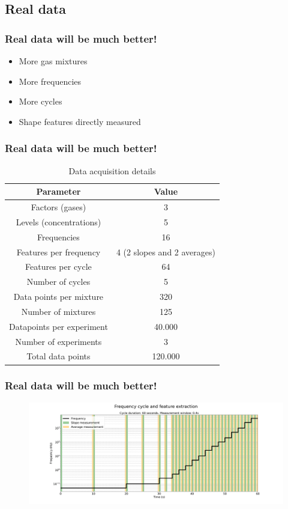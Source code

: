 \documentclass{beamer}
\begin{document}
\begin{frame}
	\section{Real data}
	\frametitle{Real data will be much better!}
	\begin{itemize}
		\item More gas mixtures
		\item More frequencies
		\item More cycles
		\item Shape features directly measured
		\end{itemize}
\end{frame}

\begin{frame}
	\frametitle{Real data will be much better!}
	\begin{table}[h]
		\centering
		\caption{Data acquisition details}
		\label{tab:measurements}
		\begin{tabular}{|c|c|}
			\hline
			\textbf{Parameter} & \textbf{Value} \\
			\hline
			Factors (gases) & 3 \\
			\hline
			Levels (concentrations) & 5 \\
			\hline
			Frequencies & 16 \\
			\hline
			Features per frequency & 4 (2 slopes and 2 averages) \\
			\hline
			Features per cycle & 64 \\
			\hline
			Number of cycles & 5 \\
			\hline
			Data points per mixture & 320 \\
			\hline
			Number of mixtures & 125 \\
			\hline
			Datapoints per experiment & 40.000 \\
			\hline
			Number of experiments & 3 \\
			\hline
			Total data points & 120.000 \\
			\hline
		\end{tabular}
	\end{table}
\end{frame}

\begin{frame}
	\frametitle{Real data will be much better!}
	\begin{figure}[!htb]
		\centering
		\includegraphics[width=1\textwidth]{../../figures/measurement-windows.png}
		\label{fig:feat-window}
	\end{figure} 
\end{frame}
\end{document}

